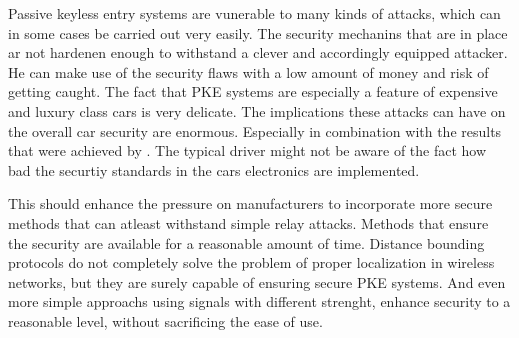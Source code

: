 Passive keyless entry systems are vunerable to many kinds of attacks,
which can in some cases be carried out very easily.
The security mechanins that are in place ar not hardenen enough to withstand
a clever and accordingly equipped attacker.
He can make use of the security flaws with a low amount of money and risk of getting caught.
The fact that PKE systems are especially a feature of expensive and luxury class cars is very delicate.
The implications these attacks can have on the overall car security are enormous.
Especially in combination with the results that were achieved by \cite{expModernAuto}.
The typical driver might not be aware of the fact how bad the securtiy standards
in the cars electronics are implemented.

This should enhance the pressure on manufacturers to incorporate more secure methods
that can atleast withstand simple relay attacks.
Methods that ensure the security are available for a reasonable amount of time.
Distance bounding protocols do not completely solve the problem of proper localization in
wireless networks,
but they are surely capable of ensuring secure PKE systems.
And even more simple approachs using signals with different strenght,
enhance security to a reasonable level,
without sacrificing the ease of use.